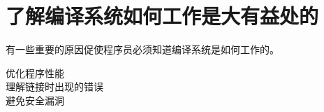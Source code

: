 
\section{了解编译系统如何工作是大有益处的}
{
    有一些重要的原因促使程序员必须知道编译系统是如何工作的。

    \begin{description}
        \item[优化程序性能]
        \item[理解链接时出现的错误]
        \item[避免安全漏洞]
    \end{description}
}
